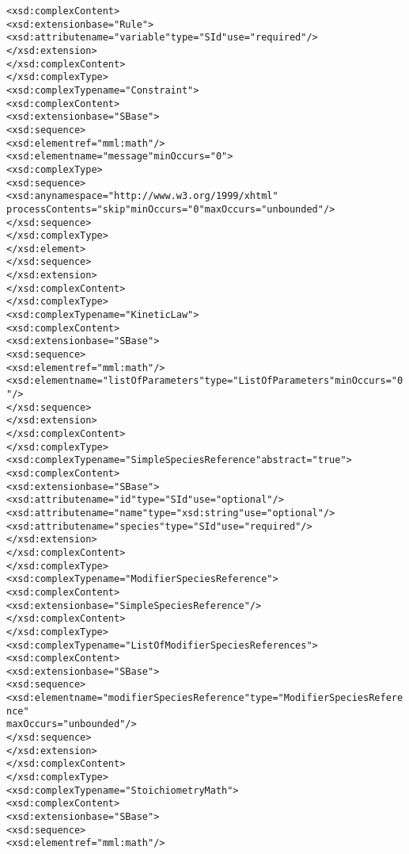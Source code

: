 \begin{alltt}
        <xsd:complexContent>
            <xsd:extension base="Rule">
                <xsd:attribute name="variable" type="SId" use="required"/>
            </xsd:extension>
        </xsd:complexContent>
    </xsd:complexType>
    <xsd:complexType name="Constraint">
        <xsd:complexContent>
            <xsd:extension base="SBase">
                <xsd:sequence>
                    <xsd:element ref="mml:math"/>
                    <xsd:element name="message" minOccurs="0">
                        <xsd:complexType>
                            <xsd:sequence>
                                <xsd:any namespace="http://www.w3.org/1999/xhtml"
                                    processContents="skip" minOccurs="0" maxOccurs="unbounded"/>
                            </xsd:sequence>
                        </xsd:complexType>
                    </xsd:element>
                </xsd:sequence>
            </xsd:extension>
        </xsd:complexContent>
    </xsd:complexType>
    <xsd:complexType name="KineticLaw">
        <xsd:complexContent>
            <xsd:extension base="SBase">
                <xsd:sequence>
                    <xsd:element ref="mml:math"/>
                    <xsd:element name="listOfParameters" type="ListOfParameters" minOccurs="0"/>
                </xsd:sequence>
            </xsd:extension>
        </xsd:complexContent>
    </xsd:complexType>
    <xsd:complexType name="SimpleSpeciesReference" abstract="true">
        <xsd:complexContent>
            <xsd:extension base="SBase">
                <xsd:attribute name="id" type="SId" use="optional"/>
                <xsd:attribute name="name" type="xsd:string" use="optional"/>
                <xsd:attribute name="species" type="SId" use="required"/>
            </xsd:extension>
        </xsd:complexContent>
    </xsd:complexType>
    <xsd:complexType name="ModifierSpeciesReference">
        <xsd:complexContent>
            <xsd:extension base="SimpleSpeciesReference"/>
        </xsd:complexContent>
    </xsd:complexType>
    <xsd:complexType name="ListOfModifierSpeciesReferences">
        <xsd:complexContent>
            <xsd:extension base="SBase">
                <xsd:sequence>
                    <xsd:element name="modifierSpeciesReference" type="ModifierSpeciesReference"
                        maxOccurs="unbounded"/>
                </xsd:sequence>
            </xsd:extension>
        </xsd:complexContent>
    </xsd:complexType>
    <xsd:complexType name="StoichiometryMath">
        <xsd:complexContent>
            <xsd:extension base="SBase">
                <xsd:sequence>
                    <xsd:element ref="mml:math"/>

\end{alltt}

